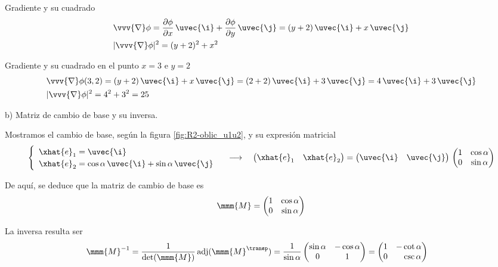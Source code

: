 Gradiente y su cuadrado
\begin{align*}
  &\vvv{\nabla}\phi
    = \dfrac{\partial\phi}{\partial x}\,\uvec{\i}
    + \dfrac{\partial\phi}{\partial y}\,\uvec{\j}
    = (y+2)\,\uvec{\i} + x\,\uvec{\j}\\
  &|\vvv{\nabla}\phi|^2
    = (y+2)^2 + x^2
\end{align*}
 
Gradiente y su cuadrado en el punto $x=3$ e $y=2$
\begin{align*}
  &\vvv{\nabla}\phi(3,2)
    = (y+2)\,\uvec{\i} + x\,\uvec{\j}
    = (2+2)\,\uvec{\i} + 3\,\uvec{\j}
    = 4\,\uvec{\i} + 3\,\uvec{\j}\\
  & |\vvv{\nabla}\phi|^2
    = 4^2 + 3^2
    = 25
\end{align*}

\noindent
b) Matriz de cambio de base y su inversa.

Mostramos el cambio de base, según la figura \ref{fig:R2-oblic_u1u2}, y su expresión
matricial
\[
  \begin{cases}
    \begin{array}{l}
      \xhat{e}_1 = \uvec{\i}\\
      \xhat{e}_2 = \cos\alpha\,\uvec{\i} + \sin\alpha\,\uvec{\j}
    \end{array}
  \end{cases}
  \longrightarrow\hspace{1em}
  \begin{pmatrix}
    \xhat{e}_1 & \xhat{e}_2
  \end{pmatrix}
  = \begin{pmatrix}
    \uvec{\i} & \uvec{\j}
  \end{pmatrix}
  \,\begin{pmatrix}
    1 & \cos\alpha\\
    0 & \sin\alpha
  \end{pmatrix}
\]

De aquí, se deduce que la matriz de cambio de base es
\[
  \mmm{M}
  =\begin{pmatrix}
    1 & \cos\alpha\\
    0 & \sin\alpha
  \end{pmatrix}
\]

La inversa resulta ser
\begin{align*}
  \mmm{M}^{-1}
  &=
    \dfrac{1}{\det(\mmm{M})}
    \,\text{adj}(\mmm{M}^\transp)
    = \dfrac{1}{\sin\alpha}
    \begin{pmatrix}
      \sin\alpha & -\cos\alpha\\
      0 & 1
    \end{pmatrix}
    = \begin{pmatrix}
      1 & -\cot\alpha\\
      0 & \phantom{-}\csc\alpha
    \end{pmatrix}
\end{align*}

